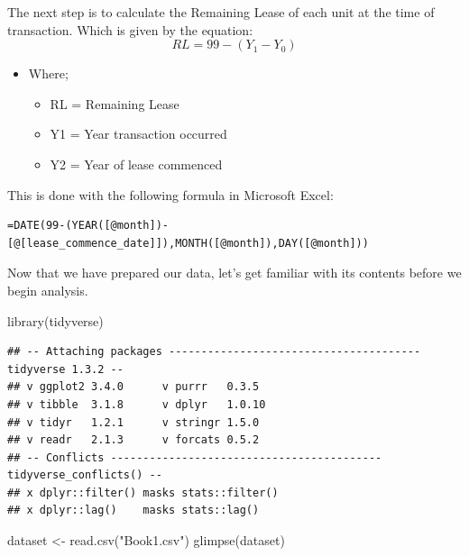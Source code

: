 \documentclass[
]{article}
\newenvironment{Shaded}{\begin{snugshade}}{\end{snugshade}}
\newcommand{\FunctionTok}[1]{\textcolor[rgb]{0.00,0.00,0.00}{#1}}
\newcommand{\NormalTok}[1]{#1}
\newcommand{\OtherTok}[1]{\textcolor[rgb]{0.56,0.35,0.01}{#1}}
\newcommand{\StringTok}[1]{\textcolor[rgb]{0.31,0.60,0.02}{#1}}
\providecommand{\tightlist}{%
  \setlength{\itemsep}{0pt}\setlength{\parskip}{0pt}}
\begin{document}
The next step is to calculate the Remaining Lease of each unit at the
time of transaction. Which is given by the equation:
\[RL =  99 - (Y_{1} - Y_{0}) \]

\begin{itemize}
\tightlist
\item
  Where;

  \begin{itemize}
  \tightlist
  \item
    RL = Remaining Lease
  \item
    Y1 = Year transaction occurred
  \item
    Y2 = Year of lease commenced\\
  \end{itemize}
\end{itemize}

This is done with the following formula in Microsoft Excel:

\begin{verbatim}
=DATE(99-(YEAR([@month])-[@[lease_commence_date]]),MONTH([@month]),DAY([@month]))
\end{verbatim}

Now that we have prepared our data, let's get familiar with its contents
before we begin analysis.

\begin{Shaded}
\begin{Highlighting}[]
\FunctionTok{library}\NormalTok{(tidyverse)}
\end{Highlighting}
\end{Shaded}

\begin{verbatim}
## -- Attaching packages --------------------------------------- tidyverse 1.3.2 --
## v ggplot2 3.4.0      v purrr   0.3.5 
## v tibble  3.1.8      v dplyr   1.0.10
## v tidyr   1.2.1      v stringr 1.5.0 
## v readr   2.1.3      v forcats 0.5.2 
## -- Conflicts ------------------------------------------ tidyverse_conflicts() --
## x dplyr::filter() masks stats::filter()
## x dplyr::lag()    masks stats::lag()
\end{verbatim}

\begin{Shaded}
\begin{Highlighting}[]
\NormalTok{dataset }\OtherTok{\textless{}{-}} \FunctionTok{read.csv}\NormalTok{(}\StringTok{"Book1.csv"}\NormalTok{)}
\FunctionTok{glimpse}\NormalTok{(dataset)}
\end{Highlighting}
\end{Shaded}
\end{document}
